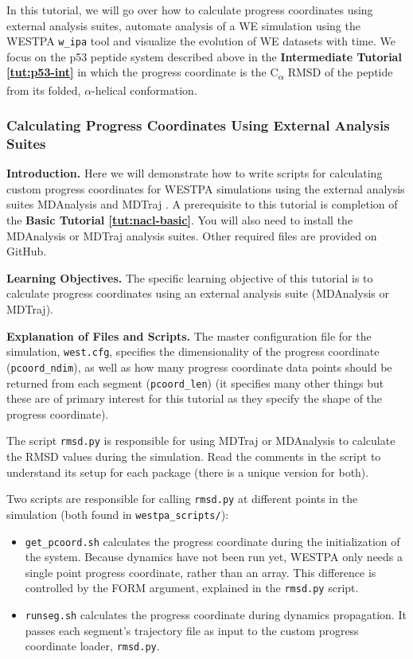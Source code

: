 In this tutorial, we will go over how to calculate progress coordinates using external analysis suites, automate analysis of a WE simulation using the WESTPA \verb|w_ipa| tool and visualize the evolution of WE datasets with time. 
We focus on the p53 peptide system described above in the \textbf{Intermediate Tutorial \ref{tut:p53-int}} in which the progress coordinate is the C\textsubscript{$\alpha$} RMSD of the peptide from its folded, $\alpha$-helical conformation.

\subsubsection{Calculating Progress Coordinates Using External Analysis Suites}

\textbf{Introduction.} Here we will demonstrate how to write scripts for calculating custom progress coordinates for WESTPA simulations using the external analysis suites MDAnalysis and MDTraj \citep{mda2011,mda2016,mdt2015}. 
A prerequisite to this tutorial is completion of the \textbf{Basic Tutorial \ref{tut:nacl-basic}}. 
You will also need to install the MDAnalysis or MDTraj analysis suites. 
Other required files are provided on GitHub.

\textbf{Learning Objectives.} The specific learning objective of this tutorial is to calculate progress coordinates using an external analysis suite (MDAnalysis or MDTraj). 

\textbf{Explanation of Files and Scripts.} The master configuration file for the simulation, \verb|west.cfg|, specifies the dimensionality of the progress coordinate (\verb|pcoord_ndim|), as well as how many progress coordinate data points should be returned from each segment (\verb|pcoord_len|) (it specifies many other things but these are of primary interest for this tutorial as they specify the shape of the progress coordinate).

The script \verb|rmsd.py| is responsible for using MDTraj or MDAnalysis to calculate the RMSD values during the simulation. 
Read the comments in the script to understand its setup for each package (there is a unique version for both).

Two scripts are responsible for calling \verb|rmsd.py| at different points in the simulation (both found in \verb|westpa_scripts/|):
\begin{itemize}
\item \verb|get_pcoord.sh| calculates the progress coordinate during the initialization of the system. 
Because dynamics have not been run yet, WESTPA only needs a single point progress coordinate, rather than an array. 
This difference is controlled by the FORM argument, explained in the \verb|rmsd.py| script.
\item \verb|runseg.sh| calculates the progress coordinate during dynamics propagation. 
It passes each segment's trajectory file as input to the custom progress coordinate loader, \verb|rmsd.py|.
\end{itemize}

